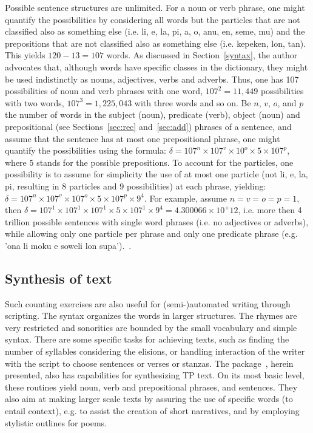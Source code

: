 Possible sentence structures are unlimited.
For a noun or verb phrase, one might quantify the possibilities
by considering all words but the particles that are not classified
also as something else
(i.e. li, e, la, pi, a, o, anu, en, seme, mu)
and the prepositions that are not classified also as something
else (i.e. kepeken, lon, tan).
This yields $120-13=107$ words.
As discussed in Section~\ref{syntax},
the author advocates that, although words have specific classes in the dictionary,
they might be used indistinctly as nouns, adjectives,
verbs and adverbs.
Thus, one has 107 possibilities of noun and verb phrases with
one word, $107^2=11,449$ possibilities with two words,
$107^3=1,225,043$ with three words and so on.
Be $n$, $v$, $o$, and $p$ the number of words in the subject (noun), predicate
(verb), object (noun) and prepositional (see Sections~\ref{sec:rec} and~\ref{sec:add}) phrases of a sentence,
and assume that the sentence has at most one prepositional phrase,
one might quantify the possibilities using the formula:
$\delta = 107^n\times 107^v\times 10^o \times 5\times 107^p$,
where $5$ stands for the possible prepositions.
To account for the particles, one possibility is
to assume for simplicity the use of at most one particle
(not li, e, la, pi, resulting in $8$ particles and $9$ possibilities)
at each phrase, yielding:
$\delta = 107^n\times 107^v\times 107^o \times 5\times 107^p\times 9^4$.
For example, assume $n=v=o=p=1$, then
$\delta=107^1\times 107^1\times 107^1 \times 5\times 107^1\times 9^4=
 4.300066\times 10^+12$,
i.e. more then 4 trillion possible
sentences with single word phrases (i.e. no adjectives or adverbs),
while allowing only one particle per phrase
and only one predicate phrase
(e.g. 'ona li moku e soweli lon supa').~\cite{tokipona}.

\subsection{Synthesis of text}\label{synth}
Such counting exercises are also useful
for (semi-)automated writing through scripting.
The syntax organizes the words in larger structures.
The rhymes are very restricted and sonorities are
bounded by the small vocabulary and simple syntax.
There are some specific tasks for achieving texts,
such as finding the number of syllables considering the elisions,
or handling interaction of the writer with the script
to choose sentences or verses or stanzas.
The package~\cite{tokipona}, herein presented, also
has capabilities for synthesizing TP text.
On its most basic level, these routines yield
noun, verb and prepositional phrases,
and sentences.
They also aim at making larger scale texts
by assuring the use of specific words (to entail context),
e.g. to assist the creation of short narratives,
and by employing stylistic outlines for poems.


